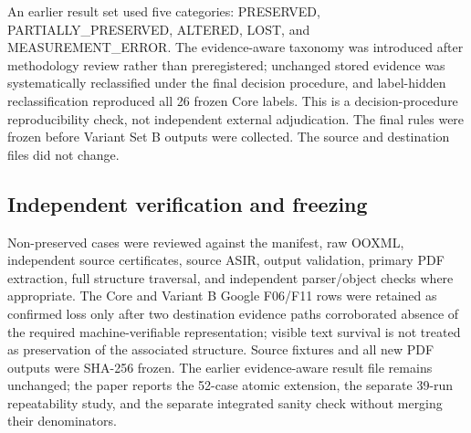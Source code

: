 An earlier result set used five categories: PRESERVED, PARTIALLY\_PRESERVED, ALTERED, LOST, and MEASUREMENT\_ERROR. The evidence-aware taxonomy was introduced after methodology review rather than preregistered; unchanged stored evidence was systematically reclassified under the final decision procedure, and label-hidden reclassification reproduced all 26 frozen Core labels. This is a decision-procedure reproducibility check, not independent external adjudication. The final rules were frozen before Variant Set B outputs were collected. The source and destination files did not change.

\subsection{Independent verification and freezing}

Non-preserved cases were reviewed against the manifest, raw OOXML, independent source certificates, source ASIR, output validation, primary PDF extraction, full structure traversal, and independent parser/object checks where appropriate. The Core and Variant B Google F06/F11 rows were retained as confirmed loss only after two destination evidence paths corroborated absence of the required machine-verifiable representation; visible text survival is not treated as preservation of the associated structure. Source fixtures and all new PDF outputs were SHA-256 frozen. The earlier evidence-aware result file remains unchanged; the paper reports the 52-case atomic extension, the separate 39-run repeatability study, and the separate integrated sanity check without merging their denominators.


